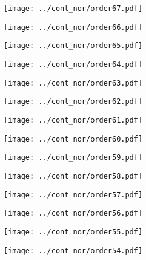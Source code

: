 \documentclass{article}
\begin{document}
\begin{figure}[H]
    \centering
    \texttt{[image: ../cont\_nor/order67.pdf]}
\end{figure}
\begin{figure}[H]
    \centering
    \texttt{[image: ../cont\_nor/order66.pdf]}
\end{figure}
\begin{figure}[H]
    \centering
    \texttt{[image: ../cont\_nor/order65.pdf]}
\end{figure}
\begin{figure}[H]
    \centering
    \texttt{[image: ../cont\_nor/order64.pdf]}
\end{figure}
\begin{figure}[H]
    \centering
    \texttt{[image: ../cont\_nor/order63.pdf]}
\end{figure}
\begin{figure}[H]
    \centering
    \texttt{[image: ../cont\_nor/order62.pdf]}
\end{figure}
\begin{figure}[H]
    \centering
    \texttt{[image: ../cont\_nor/order61.pdf]}
\end{figure}
\begin{figure}[H]
    \centering
    \texttt{[image: ../cont\_nor/order60.pdf]}
\end{figure}
\begin{figure}[H]
    \centering
    \texttt{[image: ../cont\_nor/order59.pdf]}
\end{figure}
\begin{figure}[H]
    \centering
    \texttt{[image: ../cont\_nor/order58.pdf]}
\end{figure}
\begin{figure}[H]
    \centering
    \texttt{[image: ../cont\_nor/order57.pdf]}
\end{figure}
\begin{figure}[H]
    \centering
    \texttt{[image: ../cont\_nor/order56.pdf]}
\end{figure}
\begin{figure}[H]
    \centering
    \texttt{[image: ../cont\_nor/order55.pdf]}
\end{figure}
\begin{figure}[H]
    \centering
    \texttt{[image: ../cont\_nor/order54.pdf]}
\end{figure}
\end{document}
